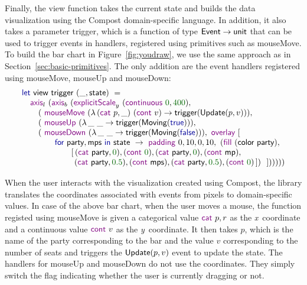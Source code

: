 \documentclass{jfp}
\newcommand{\X}{\emph{x}\ }
\newcommand{\Y}{\emph{y}\ }
\newcommand{\num}[1]{\textcolor{numclr}{#1}}
\newcommand{\ident}[1]{\textnormal{\textcolor{idclr}{\sffamily #1}}}
\newcommand{\kvd}[1]{\textnormal{\textcolor{kvdclr}{\sffamily #1}}}
\newcommand{\fkvd}[1]{\textnormal{\textcolor{fkvdclr}{\sffamily #1}}}
\begin{document}
Finally, the \ident{view} function takes the current state and builds the data visualization
using the Compost domain-specific language. In addition, it also takes a parameter \ident{trigger},
which is a function of type $\ident{Event}\rightarrow\ident{unit}$ that can be used to trigger
events in handlers, registered using primitives such as \kvd{mouseMove}.
To build the bar chart in Figure~\ref{fig:youdraw}, we use the same approach as in
Section~\ref{sec:basic-primitives}. The only addition are the event handlers registered using
\kvd{mouseMove}, \kvd{mouseUp} and \kvd{mouseDown}:
%
\begin{equation*}
\begin{array}{l}
\fkvd{let}~\ident{view}~\ident{trigger}~(\_, \ident{state})~=\\
\quad \kvd{axis}_l~(\kvd{axis}_b~(\kvd{explicitScale}_y~(\kvd{continuous}~\num{0},\num{400}),\\
\qquad (~\kvd{mouseMove}~(\lambda \,(\kvd{cat}~p,\_)~(\kvd{cont}~v)\rightarrow \ident{trigger}(\ident{Update}(p, v))),\\
\qquad (~\kvd{mouseUp}~(\lambda \,\_~\_\rightarrow \ident{trigger}(\ident{Moving}(\fkvd{true}))),\\
\qquad (~\kvd{mouseDown}~(\lambda \,\_~\_\rightarrow \ident{trigger}(\ident{Moving}(\fkvd{false}))),~\kvd{overlay}~[\\
\qquad \qquad \fkvd{for}~\ident{party}, \ident{mps}~\fkvd{in}~\ident{state}~\rightarrow~\kvd{padding}~0,10,0,10,~(\kvd{fill}~(\ident{color}~\ident{party}),\\
\qquad \qquad\quad\quad [\,(\kvd{cat}~\ident{party}, \num{0}), (\kvd{cont}~\num{0}), (\kvd{cat}~\ident{party}, \num{0}), (\kvd{cont}~\ident{mp}),\\
\qquad \qquad\quad\quad \hspace{0.38em}(\kvd{cat}~\ident{party}, \num{0.5}), (\kvd{cont}~\ident{mps}), (\kvd{cat}~\ident{party}, \num{0.5}), (\kvd{cont}~\num{0}) \,])~~])))))\\
\end{array}
\end{equation*}

When the user interacts with the visualization created using Compost, the library
translates the coordinates associated with events from pixels to domain-specific
values. In case of the above bar chart, when the user moves a mouse, the function registed
using \kvd{mouseMove} is given a categorical value $\kvd{cat}~p, r$ as the \X coordinate and
a continuous value $\kvd{cont}~v$ as the \Y coordinate. It then takes $p$, which is the name
of the party corresponding to the bar and the value $v$ corresponding to the number of seats
and triggers the $\ident{Update}(p, v)$ event to update the state. The handlers for
\kvd{mouseUp} and \kvd{mouseDown} do not use the coordinates. They simply switch the flag
indicating whether the user is currently dragging or not.
\end{document}
